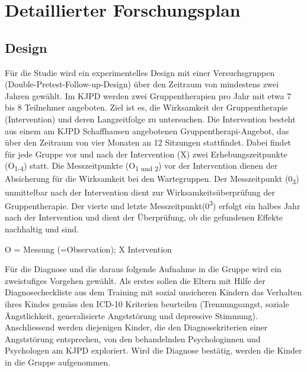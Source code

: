 %
%
\chapter{Detaillierter Forschungsplan}\label{chap.forschungsplan}
\glsresetall
\section{Design} 
Für die Studie wird ein experimentelles Design mit einer Versuchsgruppen (Double-Pretest-Follow-up-Design) über den Zeitraum von mindestens zwei Jahren gewählt. Im KJPD werden zwei Gruppentherapien pro Jahr mit etwa 7 bis 8 Teilnehmer angeboten. Ziel ist es, die Wirksamkeit der Gruppentherapie (Intervention) und deren Langzeitfolge zu untersuchen. Die Intervention besteht aus einem am KJPD Schaffhausen angebotenen Gruppentherapi-Angebot, das über den Zeitraum von vier Monaten an 12 Sitzungen stattfindet. Dabei findet für jede Gruppe vor und nach der Intervention (X) zwei Erhebungszeitpunkte (O\textsubscript{1-4}) statt. Die Messzeitpunkte (O\textsubscript{1 und 2}) vor der Intervention dienen der Absicherung für die Wirksamkeit bei den Wartegruppen. Der Messzeitpunkt (0\textsubscript{3}) unmittelbar nach der Intervention dient zur Wirksamkeitsüberprüfung der Gruppentherapie. Der vierte und letzte Messzeitpunkt(0\textsuperscript{3}) erfolgt ein halbes Jahr nach der Intervention und dient der Überprüfung, ob die gefundenen Effekte nachhaltig und sind.
\begin{center}
    
    O = Messung (=Observation); X Intervention
\end{center}
Für die Diagnose und die daraus folgende Aufnahme in die Gruppe wird ein zweistufiges Vorgehen gewählt. Als erstes sollen die Eltern mit Hilfe der Diagnosecheckliste aus dem Training mit sozial unsicheren Kindern \cite{Petermann:2015} das Verhalten ihres Kindes gemäss den ICD-10 Kriterien beurteilen (Trennungsangst, soziale Ängstlichkeit, generalisierte Angststörung und depressive Stimmung). Anschliessend werden diejenigen Kinder, die den Diagnosekriterien einer Angststörung entsprechen, von den behandelnden Psychologinnen und Psychologen am KJPD exploriert. Wird die Diagnose bestätig, werden die Kinder in die Gruppe aufgenommen. 

